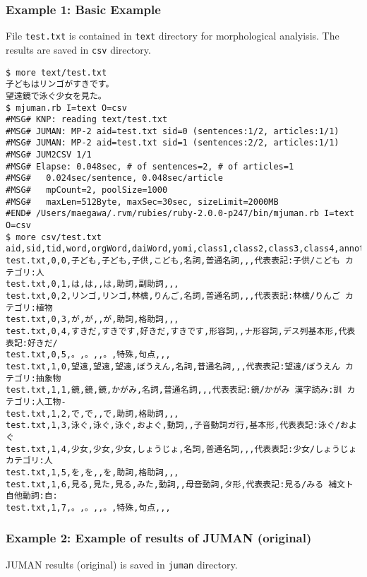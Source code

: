 \subsubsection*{Example 1: Basic Example}

File \verb|test.txt| is contained in \verb|text| directory for morphological analyisis. The results are saved in \verb|csv| directory. 


\begin{Verbatim}[baselinestretch=0.7,frame=single]
$ more text/test.txt
子どもはリンゴがすきです。
望遠鏡で泳ぐ少女を見た。
$ mjuman.rb I=text O=csv
#MSG# KNP: reading text/test.txt
#MSG# JUMAN: MP-2 aid=test.txt sid=0 (sentences:1/2, articles:1/1)
#MSG# JUMAN: MP-2 aid=test.txt sid=1 (sentences:2/2, articles:1/1)
#MSG# JUM2CSV 1/1
#MSG# Elapse: 0.048sec, # of sentences=2, # of articles=1
#MSG#   0.024sec/sentence, 0.048sec/article
#MSG#   mpCount=2, poolSize=1000
#MSG#   maxLen=512Byte, maxSec=30sec, sizeLimit=2000MB
#END# /Users/maegawa/.rvm/rubies/ruby-2.0.0-p247/bin/mjuman.rb I=text O=csv
$ more csv/test.txt
aid,sid,tid,word,orgWord,daiWord,yomi,class1,class2,class3,class4,annotation
test.txt,0,0,子ども,子ども,子供,こども,名詞,普通名詞,,,代表表記:子供/こども カテゴリ:人
test.txt,0,1,は,は,,は,助詞,副助詞,,,
test.txt,0,2,リンゴ,リンゴ,林檎,りんご,名詞,普通名詞,,,代表表記:林檎/りんご カテゴリ:植物
test.txt,0,3,が,が,,が,助詞,格助詞,,,
test.txt,0,4,すきだ,すきです,好きだ,すきです,形容詞,,ナ形容詞,デス列基本形,代表表記:好きだ/
test.txt,0,5,。,。,,。,特殊,句点,,,
test.txt,1,0,望遠,望遠,望遠,ぼうえん,名詞,普通名詞,,,代表表記:望遠/ぼうえん カテゴリ:抽象物
test.txt,1,1,鏡,鏡,鏡,かがみ,名詞,普通名詞,,,代表表記:鏡/かがみ 漢字読み:訓 カテゴリ:人工物-
test.txt,1,2,で,で,,で,助詞,格助詞,,,
test.txt,1,3,泳ぐ,泳ぐ,泳ぐ,およぐ,動詞,,子音動詞ガ行,基本形,代表表記:泳ぐ/およぐ
test.txt,1,4,少女,少女,少女,しょうじょ,名詞,普通名詞,,,代表表記:少女/しょうじょ カテゴリ:人
test.txt,1,5,を,を,,を,助詞,格助詞,,,
test.txt,1,6,見る,見た,見る,みた,動詞,,母音動詞,タ形,代表表記:見る/みる 補文ト 自他動詞:自:
test.txt,1,7,。,。,,。,特殊,句点,,,
\end{Verbatim}
\subsubsection*{Example 2: Example of results of JUMAN (original)}

JUMAN results (original) is saved in \verb|juman| directory. 


